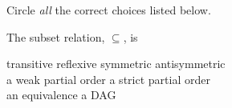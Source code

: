 \documentclass[handout]{mcs}
\begin{document}



\LARGE{
Circle \emph{all} the correct choices listed below.

The subset relation, $\subseteq$, is

\begin{center}
transitive \qquad reflexive \qquad symmetric \qquad antisymmetric\\
a weak partial order \qquad a strict partial order\\
 an equivalence \qquad a DAG
\end{center}
}


\end{document}
